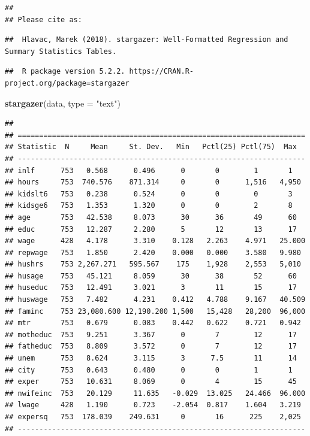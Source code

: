 \documentclass[]{book}
\newenvironment{Shaded}{\begin{snugshade}}{\end{snugshade}}
\newcommand{\KeywordTok}[1]{\textcolor[rgb]{0.13,0.29,0.53}{\textbf{#1}}}
\newcommand{\DataTypeTok}[1]{\textcolor[rgb]{0.13,0.29,0.53}{#1}}
\newcommand{\StringTok}[1]{\textcolor[rgb]{0.31,0.60,0.02}{#1}}
\newcommand{\NormalTok}[1]{#1}
\begin{document}
\begin{verbatim}
## 
## Please cite as:
\end{verbatim}

\begin{verbatim}
##  Hlavac, Marek (2018). stargazer: Well-Formatted Regression and Summary Statistics Tables.
\end{verbatim}

\begin{verbatim}
##  R package version 5.2.2. https://CRAN.R-project.org/package=stargazer
\end{verbatim}

\begin{Shaded}
\begin{Highlighting}[]
\KeywordTok{stargazer}\NormalTok{(data, }\DataTypeTok{type =} \StringTok{"text"}\NormalTok{)}
\end{Highlighting}
\end{Shaded}

\begin{verbatim}
## 
## ===================================================================
## Statistic  N     Mean     St. Dev.   Min   Pctl(25) Pctl(75)  Max  
## -------------------------------------------------------------------
## inlf      753   0.568      0.496      0       0        1       1   
## hours     753  740.576    871.314     0       0      1,516   4,950 
## kidslt6   753   0.238      0.524      0       0        0       3   
## kidsge6   753   1.353      1.320      0       0        2       8   
## age       753   42.538     8.073      30      36       49      60  
## educ      753   12.287     2.280      5       12       13      17  
## wage      428   4.178      3.310    0.128   2.263    4.971   25.000
## repwage   753   1.850      2.420    0.000   0.000    3.580   9.980 
## hushrs    753 2,267.271   595.567    175    1,928    2,553   5,010 
## husage    753   45.121     8.059      30      38       52      60  
## huseduc   753   12.491     3.021      3       11       15      17  
## huswage   753   7.482      4.231    0.412   4.788    9.167   40.509
## faminc    753 23,080.600 12,190.200 1,500   15,428   28,200  96,000
## mtr       753   0.679      0.083    0.442   0.622    0.721   0.942 
## motheduc  753   9.251      3.367      0       7        12      17  
## fatheduc  753   8.809      3.572      0       7        12      17  
## unem      753   8.624      3.115      3      7.5       11      14  
## city      753   0.643      0.480      0       0        1       1   
## exper     753   10.631     8.069      0       4        15      45  
## nwifeinc  753   20.129     11.635   -0.029  13.025   24.466  96.000
## lwage     428   1.190      0.723    -2.054  0.817    1.604   3.219 
## expersq   753  178.039    249.631     0       16      225    2,025 
## -------------------------------------------------------------------
\end{verbatim}
\end{document}
